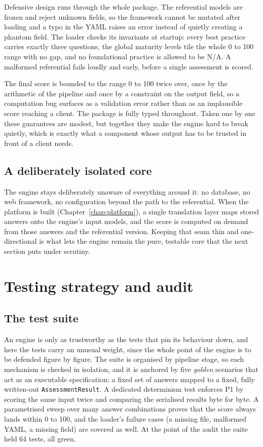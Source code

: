 Defensive design runs through the whole package. The referential models are frozen
and reject unknown fields, so the framework cannot be mutated after loading and a
typo in the YAML raises an error instead of quietly creating a phantom field. The
loader checks its invariants at startup: every best practice carries exactly three
questions, the global maturity levels tile the whole 0 to 100 range with no gap, and
no foundational practice is allowed to be N/A. A malformed referential fails loudly
and early, before a single assessment is scored.

The final score is bounded to the range 0 to 100 twice over, once by the arithmetic
of the pipeline and once by a constraint on the output field, so a computation bug
surfaces as a validation error rather than as an implausible score reaching a
client. The package is fully typed throughout. Taken one by one these guarantees are
modest, but together they make the engine hard to break quietly, which is exactly
what a component whose output has to be trusted in front of a client needs.

\subsection{A deliberately isolated core}

The engine stays deliberately unaware of everything around it: no database, no web
framework, no configuration beyond the path to the referential. When the platform is
built (Chapter~\ref{chap:platform}), a single translation layer maps stored answers
onto the engine's input models, and the score is computed on demand from those
answers and the referential version. Keeping that seam thin and one-directional is
what lets the engine remain the pure, testable core that the next section puts under
scrutiny.


\section{Testing strategy and audit}
\label{sec:se-testing}

\subsection{The test suite}

An engine is only as trustworthy as the tests that pin its behaviour down, and here
the tests carry an unusual weight, since the whole point of the engine is to be
defended figure by figure. The suite is organised by pipeline stage, so each
mechanism is checked in isolation, and it is anchored by five \emph{golden}
scenarios that act as an executable specification: a fixed set of answers mapped to
a fixed, fully written-out \texttt{AssessmentResult}. A dedicated determinism test
enforces P1 by scoring the same input twice and comparing the serialised results
byte for byte. A parametrised sweep over many answer combinations proves that the
score always lands within 0 to 100, and the loader's failure cases (a missing file,
malformed YAML, a missing field) are covered as well. At the point of the audit the
suite held 64 tests, all green.

